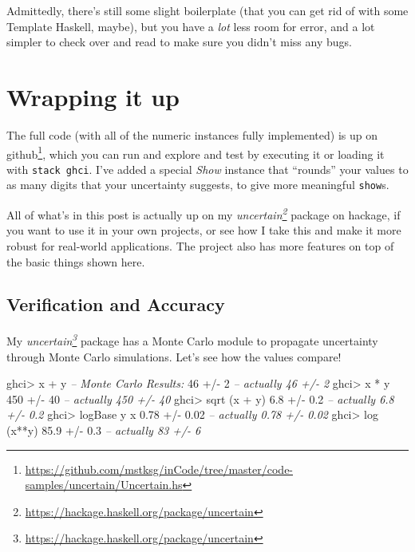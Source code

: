 \documentclass[]{article}
\newenvironment{Shaded}{}{}
\newcommand{\DecValTok}[1]{\textcolor[rgb]{0.25,0.63,0.44}{#1}}
\newcommand{\FloatTok}[1]{\textcolor[rgb]{0.25,0.63,0.44}{#1}}
\newcommand{\CommentTok}[1]{\textcolor[rgb]{0.38,0.63,0.69}{\textit{#1}}}
\newcommand{\FunctionTok}[1]{\textcolor[rgb]{0.02,0.16,0.49}{#1}}
\newcommand{\NormalTok}[1]{#1}
\renewcommand{\href}[2]{#2\footnote{\url{#1}}}
\begin{document}
Admittedly, there's still some slight boilerplate (that you can get rid of with
some Template Haskell, maybe), but you have a \emph{lot} less room for error,
and a lot simpler to check over and read to make sure you didn't miss any bugs.

\section{Wrapping it up}\label{wrapping-it-up}

The full code (with all of the numeric instances fully implemented) is up
\href{https://github.com/mstksg/inCode/tree/master/code-samples/uncertain/Uncertain.hs}{on
github}, which you can run and explore and test by executing it or loading it
with \texttt{stack\ ghci}. I've added a special \emph{Show} instance that
``rounds'' your values to as many digits that your uncertainty suggests, to give
more meaningful \texttt{show}s.

All of what's in this post is actually up on my
\emph{\href{https://hackage.haskell.org/package/uncertain}{uncertain}} package
on hackage, if you want to use it in your own projects, or see how I take this
and make it more robust for real-world applications. The project also has more
features on top of the basic things shown here.

\subsection{Verification and Accuracy}\label{verification-and-accuracy}

My \emph{\href{https://hackage.haskell.org/package/uncertain}{uncertain}}
package has a Monte Carlo module to propagate uncertainty through Monte Carlo
simulations. Let's see how the values compare!

\begin{Shaded}
\begin{Highlighting}[]
\NormalTok{ghci}\FunctionTok{>}\NormalTok{ x }\FunctionTok{+}\NormalTok{ y         }\CommentTok{-- Monte Carlo Results:}
\DecValTok{46} \FunctionTok{+/-} \DecValTok{2}            \CommentTok{-- actually 46 +/- 2}
\NormalTok{ghci}\FunctionTok{>}\NormalTok{ x }\FunctionTok{*}\NormalTok{ y}
\DecValTok{450} \FunctionTok{+/-} \DecValTok{40}          \CommentTok{-- actually 450 +/- 40}
\NormalTok{ghci}\FunctionTok{>}\NormalTok{ sqrt (x }\FunctionTok{+}\NormalTok{ y)}
\FloatTok{6.8} \FunctionTok{+/-} \FloatTok{0.2}         \CommentTok{-- actually 6.8 +/- 0.2}
\NormalTok{ghci}\FunctionTok{>}\NormalTok{ logBase y x}
\FloatTok{0.78} \FunctionTok{+/-} \FloatTok{0.02}       \CommentTok{-- actually 0.78 +/- 0.02}
\NormalTok{ghci}\FunctionTok{>}\NormalTok{ log (x}\FunctionTok{**}\NormalTok{y)}
\FloatTok{85.9} \FunctionTok{+/-} \FloatTok{0.3}        \CommentTok{-- actually 83 +/- 6}
\end{Highlighting}
\end{Shaded}
\end{document}

